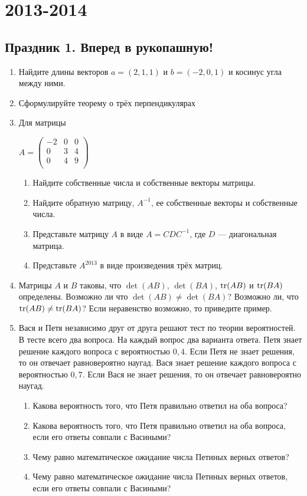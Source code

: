 \documentclass[12pt, a4paper]{article}
\begin{document}
\section{2013-2014}

\subsection{Праздник 1. Вперед в рукопашную!}


\begin{enumerate}
\item Найдите длины векторов $a=(2,1,1)$ и $b=(-2,0,1)$ и косинус угла между ними.
\item Сформулируйте теорему о трёх перпендикулярах
\item Для матрицы

$A=\left(%
\begin{array}{ccc}
  -2 & 0 & 0 \\
  0 & 3 & 4 \\
  0 & 4 & 9 \\
\end{array}%
\right)$ \\

\begin{enumerate}
\item Найдите собственные числа и собственные векторы матрицы.
\item Найдите обратную матрицу, $A^{-1}$, ее собственные векторы и собственные числа.
\item Представьте матрицу $A$ в виде $A=CDC^{-1}$, где $D$ — диагональная матрица.
\item Представьте $A^{2013}$ в виде произведения трёх матриц.
\end{enumerate}

\item Матрицы $A$ и $B$ таковы, что $\det(AB)$, $\det(BA)$, $\operatorname{tr}(AB)$ и $\operatorname{tr}(BA)$ определены. Возможно ли что $\det(AB)\neq \det(BA)$? Возможно ли, что $\operatorname{tr}(AB)\neq \operatorname{tr}(BA)$? Если неравенство возможно, то приведите пример.

\item Вася и Петя независимо друг от друга решают тест по теории вероятностей. В тесте всего два вопроса. На каждый вопрос два варианта ответа. Петя знает решение каждого вопроса с вероятностью $0{,}4$. Если Петя не знает решения, то он отвечает равновероятно наугад. Вася знает решение каждого вопроса с вероятностью $0{,}7$. Если Вася не знает решения, то он отвечает равновероятно наугад.
\begin{enumerate}
\item Какова вероятность того, что Петя правильно ответил на оба вопроса?
\item Какова вероятность того, что Петя правильно ответил на оба вопроса, если его ответы совпали с Васиными?
\item Чему равно математическое ожидание числа Петиных верных ответов?
\item Чему равно математическое ожидание числа Петиных верных ответов, если его ответы совпали с Васиными?
\end{enumerate}


\end{enumerate}
\end{document}
